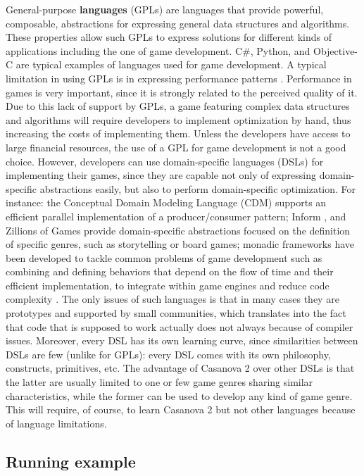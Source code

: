 General-purpose \textbf{languages} (GPLs) are languages that provide powerful, composable, abstractions for expressing general data structures and algorithms. These properties allow such GPLs to express solutions for different kinds of applications including the one of game development. C\#, Python, and Objective-C are typical examples of languages used for game development. A typical limitation in using GPLs is in expressing performance patterns \cite{cheung2015bridging}. Performance in games is very important, since it is strongly related to the perceived quality of it. Due to this lack of support by GPLs, a game featuring complex data structures and algorithms will require developers to implement optimization by hand, thus increasing the costs of implementing them. Unless the developers have access to large financial resources, the use of a GPL for game development is not a good choice. However, developers can use domain-specific languages (DSLs) for implementing their games, since they are capable not only of expressing domain-specific abstractions easily, but also to perform domain-specific optimization. For instance: the Conceptual Domain Modeling Language (CDM) \cite{best2009searching} supports an efficient parallel implementation of a producer/consumer pattern; Inform \cite{reed2010creating}, and Zillions of Games \cite{mallett1998zillions} provide domain-specific abstractions focused on the definition of specific genres, such as storytelling or board games; monadic frameworks have been developed to tackle common problems of game development such as combining and defining behaviors that depend on the flow of time and their efficient implementation, to integrate within game engines \cite{maggiore2011monadic} and reduce code complexity \cite{tabareau2013typed}. The only issues of such languages is that in many cases they are prototypes and supported by small communities, which translates into the fact that code that is supposed to work actually does not always because of compiler issues. Moreover, every DSL has its own learning curve, since similarities between DSLs are few (unlike for GPLs): every DSL comes with its own philosophy, constructs, primitives, etc. The advantage of Casanova 2 over other DSLs is that the latter are usually limited to one or few game genres sharing similar characteristics, while the former can be used to develop any kind of game genre. This will require, of course, to learn Casanova 2 but not other languages because of language limitations.


\subsection{Running example}

